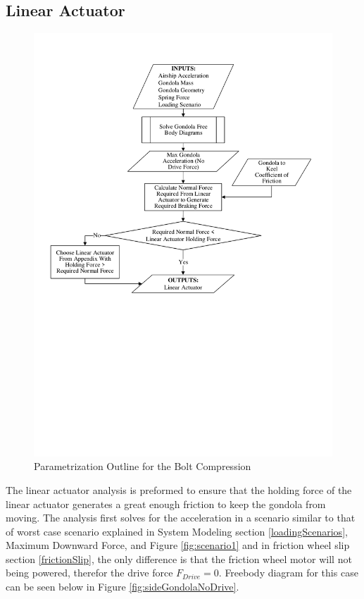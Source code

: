 \documentclass[../main.tex]{subfiles}
\begin{document}
\subsection{Linear Actuator} 
\label{linearActuator}
\begin{figure}[H]
	\centering
	\includegraphics[width=\linewidth]{img/paramaterization/linearActuator.pdf}
	\caption{Parametrization Outline for the Bolt Compression}
	\label{fig:linearActuatorParametrization}
\end{figure}

The linear actuator analysis is preformed to ensure that the holding force of the linear actuator generates a great enough friction to keep the gondola from moving. The analysis first solves for the acceleration in a scenario similar to that of worst case scenario explained in System Modeling section \ref{loadingScenarios}, Maximum Downward Force, and Figure \ref{fig:scenario1} and in friction wheel slip section \ref{frictionSlip}, the only difference is that the friction wheel motor will not being powered, therefor the drive force $F_{Drive} = 0$. Freebody diagram for this case can be seen below in Figure \ref{fig:sideGondolaNoDrive}.
\end{document}
